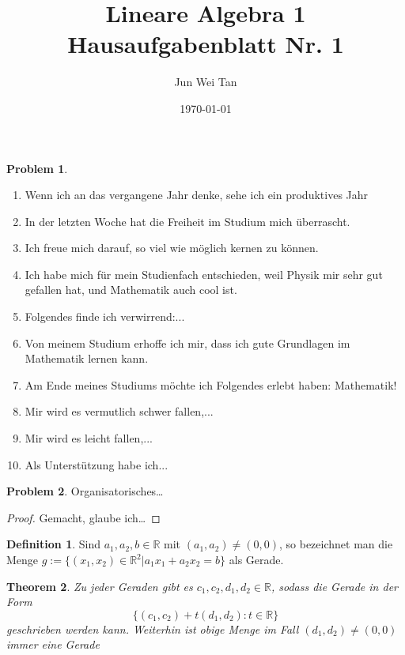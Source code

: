 \documentclass[prb,12pt]{revtex4-2}
\newtheorem{Theorem}{Theorem}
\theoremstyle{definition}
\newtheorem{Problem}{Problem}
\theoremstyle{definition}
\newtheorem{Definition}[Theorem]{Definition}
\newenvironment{parts}{\begin{enumerate}[label=(\alph*)]}{\end{enumerate}}
\newcommand{\R}{\mathbb{R}}
\begin{document}
	\title{Lineare Algebra 1 Hausaufgabenblatt Nr. 1}
	\author{Jun Wei Tan}
	\date{\today}
	\maketitle
\begin{Problem}
\begin{parts}
	\item Wenn ich an das vergangene Jahr denke, sehe ich ein produktives Jahr
	\item In der letzten Woche hat die Freiheit im Studium mich \"{u}berrascht.
	\item Ich freue mich darauf, so viel wie m\"{o}glich kernen zu k\"{o}nnen.
	\item Ich habe mich f\"{u}r mein Studienfach entschieden, weil Physik mir sehr gut gefallen hat, und Mathematik auch cool ist.
	\item Folgendes finde ich verwirrend:...
	\item  Von meinem Studium erhoffe ich mir, dass ich gute Grundlagen im Mathematik lernen kann.
	\item  Am Ende meines Studiums m\"{o}chte ich Folgendes erlebt haben: Mathematik!
	\item  Mir wird es vermutlich schwer fallen,...
	\item Mir wird es leicht fallen,...
	\item  Als Unterst\"{u}tzung habe ich...
\end{parts}	
\end{Problem}

\begin{Problem}
	Organisatorisches\ldots
\end{Problem}

\begin{proof}
	Gemacht, glaube ich\ldots
\end{proof}

\begin{Definition}\label{def:line1}
	Sind $a_1,a_2,b\in \R$  mit $(a_1, a_2) \neq (0, 0)$, so bezeichnet man die Menge $g := \{(x_1, x_2) \in \R^2 | a_1x_1 + a_2x_2 = b\}$ als Gerade.
\end{Definition}

\begin{Theorem}
	Zu jeder Geraden gibt es $c_1, c_2, d_1, d_2 \in \R$, sodass die Gerade in der Form
\[\{(c_1, c_2) + t(d_1, d_2) : t \in \R\}\]
geschrieben werden kann. Weiterhin ist obige Menge im Fall $(d_1, d_2) \neq  (0, 0)$ immer eine Gerade
\end{Theorem}
\end{document}
